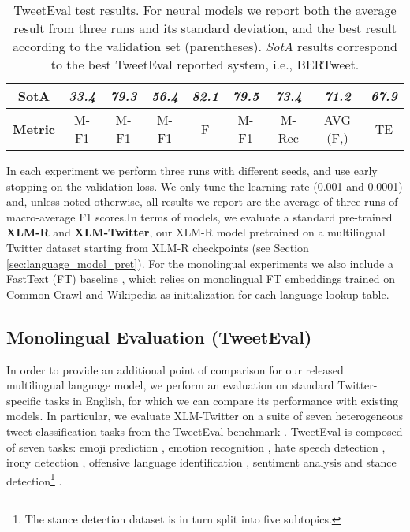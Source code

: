 \documentclass[10pt, a4paper]{article}
\begin{document}
\begin{table*}
{\begin{tabular}{c|c|c|c|c|c|c|c||c}
SotA &
  \textit{33.4} &
  \textit{79.3} &
  \textit{56.4} &
  \textit{82.1} &
  \textit{79.5} &
  \textit{73.4} &
  \textit{71.2} &


 
  \textit{67.9} \\ \hline \hline
\multicolumn{1}{c|}{\textbf{Metric}} &
  M-F1 &
  M-F1 &
  M-F1 &
  F &
  M-F1 &
  M-Rec &
  AVG (F,) & TE
   \\ \bottomrule
\end{tabular}
}
\caption{\label{table-results} TweetEval test results. For neural models we report both the average result from three runs and its standard deviation, and the best result according to the validation set (parentheses). \textit{SotA} results correspond to the best TweetEval reported system, i.e., BERTweet.}
\end{table*}


In each experiment we perform three runs with different seeds, and use early stopping on the validation loss. We only tune the learning rate (0.001 and 0.0001) and, unless noted otherwise, all results we report are the average of three runs of macro-average F1 scores.In terms of models, we evaluate a standard pre-trained \textbf{XLM-R} and \textbf{XLM-Twitter}, our XLM-R model pretrained on a multilingual Twitter dataset starting from XLM-R checkpoints (see Section \ref{sec:language_model_pret}). For the monolingual experiments we also include a FastText (FT) baseline \cite{joulin-etal-2017-bag}, which relies on monolingual FT embeddings trained on Common Crawl and Wikipedia \cite{grave2018learning} as initialization for each language lookup table.








\subsection{Monolingual Evaluation (TweetEval)}
\label{mono:eval}

In order to provide an additional point of comparison for our released multilingual language model, we perform an evaluation on standard Twitter-specific tasks in English, for which we can compare its performance with existing models. In particular, we evaluate XLM-Twitter on a suite of seven heterogeneous tweet classification tasks from the TweetEval benchmark \cite{barbieri-etal-2020-tweeteval}. TweetEval is composed of seven tasks: emoji prediction \cite{barbieri2018semeval}, emotion recognition \cite{mohammad2018semeval}, hate speech detection \cite{basile-etal-2019-semeval}, irony detection \cite{van2018semeval}, offensive language identification \cite{zampieri-etal-2019-semeval}, sentiment analysis \cite{rosenthal2019semeval} and stance detection\footnote{The stance detection dataset is in turn split into five subtopics.} \cite{mohammad2016semeval}.
\end{document}
